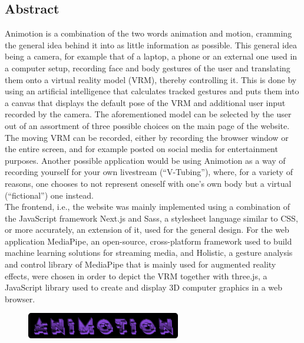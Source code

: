 \begin{spacing}{1}
    \chapter*{Abstract}
\end{spacing}
Animotion is a combination of the two words animation and motion, cramming the general idea behind it into as little information as possible. This general idea being a camera, for example that of a laptop, a phone or an external one used in a computer setup, recording face and body gestures of the user and translating them onto a virtual reality model (VRM), thereby controlling it. This is done by using an artificial intelligence that calculates tracked gestures and puts them into a canvas that displays the default pose of the VRM and additional user input recorded by the camera. The aforementioned model can be selected by the user out of an assortment of three possible choices on the main page of the website. The moving VRM can be recorded, either by recording the browser window or the entire screen, and for example posted on social media for entertainment purposes. Another possible application would be using Animotion as a way of recording yourself for your own livestream (“V-Tubing”), where, for a variety of reasons, one chooses to not represent oneself with one’s own body but a virtual (“fictional”) one instead.
\\
The frontend, i.e., the website was mainly implemented using a combination of the JavaScript framework Next.js and Sass, a stylesheet language similar to CSS, or more accurately, an extension of it, used for the general design. For the web application MediaPipe, an open-source, cross-platform framework used to build machine learning solutions for streaming media, and Holistic, a gesture analysis and control library of MediaPipe that is mainly used for augmented reality effects, were chosen in order to depict the VRM together with three.js, a JavaScript library used to create and display 3D computer graphics in a web browser.
\\
\begin{figure}[htb]
    \centering
    \includegraphics[width=0.6\textwidth]{pics/animotionlogo.png}
\end{figure}

